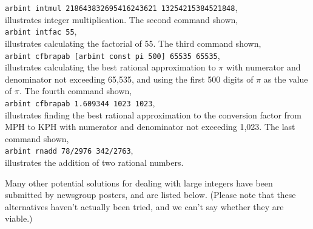 \texttt{arbint intmul 218643832695416243621 13254215384521848},\\

\noindent{}illustrates integer multiplication.  The second command shown,\\

\texttt{arbint intfac 55},\\ 

\noindent{}illustrates calculating the factorial of
55.  The third command shown, \\

\texttt{arbint cfbrapab [arbint const pi 500] 65535 65535},\\

\noindent{}illustrates calculating the best rational approximation to 
$\pi$ with numerator and denominator not exceeding 
65,535, and using the first 500 digits of $\pi$ as
the value of $\pi$.  The fourth command shown,\\

\texttt{arbint cfbrapab 1.609344 1023 1023},\\

\noindent{}illustrates finding the best rational approximation to 
the conversion factor from MPH to KPH with numerator and denominator
not exceeding 1,023.  The last command shown,\\

\texttt{arbint rnadd 78/2976 342/2763},\\

\noindent{}illustrates the addition of
two rational numbers.

Many other potential solutions for dealing with large
integers have been submitted by newsgroup
posters, and are listed below.  (Please note that these alternatives haven't actually been
tried, and we can't say whether they are viable.)

